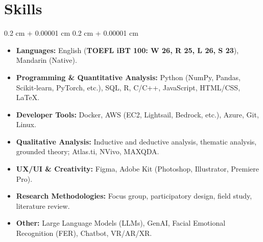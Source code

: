 \documentclass[10pt, letterpaper]{article}
\newenvironment{highlights}{
    \begin{itemize}[
        topsep=0.10 cm,
        parsep=0.10 cm,
        partopsep=0pt,
        itemsep=0pt,
        leftmargin=0.4 cm + 10pt
    ]
}{
    \end{itemize}
} %
\newenvironment{onecolentry}{
    \begin{adjustwidth}{
        0.2 cm + 0.00001 cm
    }{
        0.2 cm + 0.00001 cm
    }
}{
    \end{adjustwidth}
} %
\newenvironment{twocolentry}[2][]{
    \onecolentry
    \def\secondColumn{#2}
    \setcolumnwidth{\fill, 4.5 cm}
    \begin{paracol}{2}
}{
    \switchcolumn \raggedleft \secondColumn
    \end{paracol}
    \endonecolentry
} %
\begin{document}


    \section{Skills}

        \begin{onecolentry}
            \begin{highlights}                
                \item \textbf{Languages:} English (\textbf{TOEFL iBT 100: W 26, R 25, L 26, S 23}), Mandarin (Native).
                \item \textbf{Programming \& Quantitative Analysis:} Python (NumPy, Pandas, Scikit-learn, PyTorch, etc.), SQL, R, C/C++, JavaScript, HTML/CSS, LaTeX.
                \item \textbf{Developer Tools:} Docker, AWS (EC2, Lightsail, Bedrock, etc.), Azure, Git, Linux.
                \item \textbf{Qualitative Analysis:} Inductive and deductive analysis, thematic analysis, grounded theory; Atlas.ti, NVivo, MAXQDA.
                \item \textbf{UX/UI \& Creativity:} Figma, Adobe Kit (Photoshop, Illustrator, Premiere Pro).
                \item \textbf{Research Methodologies:} Focus group, participatory design, field study, literature review.
                \item \textbf{Other:} Large Language Models (LLMs), GenAI, Facial Emotional Recognition (FER), Chatbot, VR/AR/XR.
            \end{highlights}
        \end{onecolentry}
\end{document}
